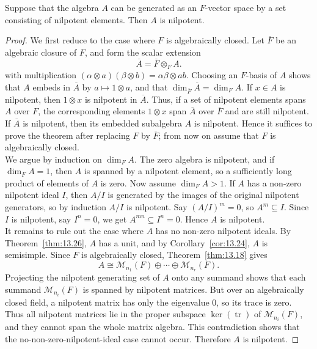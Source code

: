 \documentclass[../Odyssey_Project.tex]{subfiles}
\begin{document}
\begin{theorem}
\label{thm:13.27}
Suppose that the algebra $A$ can be generated as an $F$-vector space by a set consisting of nilpotent elements. Then $A$ is nilpotent.
\end{theorem}
\begin{proof}
    We first reduce to the case where $F$ is algebraically closed. Let $\overline{F}$ be an algebraic closure of $F$, and form the scalar extension
    \[
        \overline{A}=\overline{F}\otimes_F A.
    \]
    with multiplication $(\alpha\otimes a)(\beta\otimes b)=\alpha\beta\otimes ab$. Choosing an $F$-basis of $A$ shows that $A$ embeds in $\overline{A}$ by $a \mapsto 1 \otimes a$, and that $\dim_{\overline{F}}\overline{A}=\dim_F A$. If $x \in A$ is nilpotent, then $1 \otimes x$ is nilpotent in $\overline{A}$. Thus, if a set of nilpotent elements spans $A$ over $F$, the corresponding elements $1\otimes x$ span $\overline{A}$ over $\overline{F}$ and are still nilpotent. If $\overline{A}$ is nilpotent, then its embedded subalgebra $A$ is nilpotent. Hence it suffices to prove the theorem after replacing $F$ by $\overline{F}$; from now on assume that $F$ is algebraically closed.\\
    We argue by induction on $\dim_F A$. The zero algebra is nilpotent, and if $\dim_F A=1$, then $A$ is spanned by a nilpotent element, so a sufficiently long product of elements of $A$ is zero. Now assume $\dim_F A>1$. If $A$ has a non-zero nilpotent ideal $I$, then $A/I$ is generated by the images of the original nilpotent generators, so by induction $A/I$ is nilpotent. Say $(A/I)^m=0$, so $A^m \subseteq I$. Since $I$ is nilpotent, say $I^n=0$, we get $A^{mn} \subseteq I^n=0$. Hence $A$ is nilpotent.\\
    It remains to rule out the case where $A$ has no non-zero nilpotent ideals. By Theorem~\ref{thm:13.26}, $A$ has a unit, and by Corollary~\ref{cor:13.24}, $A$ is semisimple. Since $F$ is algebraically closed, Theorem~\ref{thm:13.18} gives
    \[
        A \cong \mathcal{M}_{n_1}(F) \oplus \cdots \oplus \mathcal{M}_{n_r}(F).
    \]
    Projecting the nilpotent generating set of $A$ onto any summand shows that each summand $\mathcal{M}_{n_i}(F)$ is spanned by nilpotent matrices. But over an algebraically closed field, a nilpotent matrix has only the eigenvalue $0$, so its trace is zero. Thus all nilpotent matrices lie in the proper subspace $\ker(\operatorname{tr})$ of $\mathcal{M}_{n_i}(F)$, and they cannot span the whole matrix algebra. This contradiction shows that the no-non-zero-nilpotent-ideal case cannot occur. Therefore $A$ is nilpotent.
\end{proof}
\end{document}
